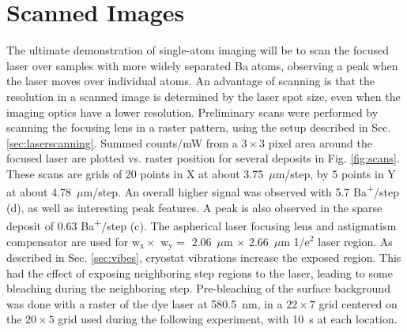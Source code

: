 \section{Scanned Images}
\label{sec:scanning}

The ultimate demonstration of single-atom imaging will be to scan the focused laser over samples with more widely separated Ba atoms, observing a peak when the laser moves over individual atoms.  An advantage of scanning is that the resolution in a scanned image is determined by the laser spot size, even when the imaging optics have a lower resolution.  Preliminary scans were performed by scanning the focusing lens in a raster pattern, using the setup described in Sec. \ref{sec:laserscanning}.  Summed counts/mW from a $3 \times 3$ pixel area around the focused laser are plotted vs. raster position for several deposits in Fig. \ref{fig:scans}.  These scans are grids of 20 points in X at about 3.75~$\mu$m/step, by 5 points in Y at about 4.78~$\mu$m/step.  An overall higher signal was observed with 5.7 Ba\textsuperscript{+}/step (d), as well as interesting peak features.  A peak is also observed in the sparse deposit of 0.63 Ba\textsuperscript{+}/step (c).  The aspherical laser focusing lens and astigmatism compensator are used for w$_{\text{x}} \times$ w$_{\text{y}} =$ 2.06~$\mu$m $\times$ 2.66~$\mu$m 1/e$^{2}$ laser region.  As described in Sec. \ref{sec:vibes}, cryostat vibrations increase the exposed region.  This had the effect of exposing neighboring step regions to the laser, leading to some bleaching during the neighboring step.  Pre-bleaching of the surface background was done with a raster of the dye laser at 580.5~nm, in a $22 \times 7$ grid centered on the $20 \times 5$ grid used during the following experiment, with 10~s at each location.

